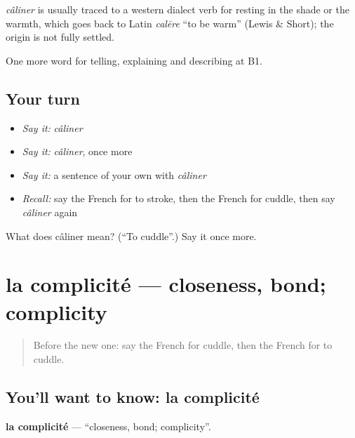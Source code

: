 \begin{cousinweb}
\emph{câliner} is usually traced to a western dialect verb for resting in the shade or the warmth, which goes back to Latin \emph{calēre} \textquotedblleft{}to be warm\textquotedblright{} (Lewis \& Short); the origin is not fully settled.
\end{cousinweb}

\begin{grammarlens}[title={What you've built}]
One more word for telling, explaining and describing at B1.
\end{grammarlens}

\subsection*{Your turn}
\begin{itemize}
\raggedright
  \item \emph{Say it:} \emph{câliner}
  \item \emph{Say it:} \emph{câliner}, once more
  \item \emph{Say it:} a sentence of your own with \emph{câliner}
  \item \emph{Recall:} say the French for to stroke, then the French for cuddle, then say \emph{câliner} again
\end{itemize}

\begin{tcolorbox}[breakable,colback=teal!4,colframe=teal!35!black,title={Before you move on}]
What does câliner mean? (\textquotedblleft{}To cuddle\textquotedblright{}.) Say it once more.
\end{tcolorbox}
\section[la complicité]{la complicité — closeness, bond; complicity}

\label{lesson:FR-C488-complicite}



\begin{quote}
Before the new one: say the French for cuddle, then the French for to cuddle.
\end{quote}

\subsection*{You'll want to know: la complicité}
\textbf{la complicité} — \textquotedblleft{}closeness, bond; complicity\textquotedblright{}.

